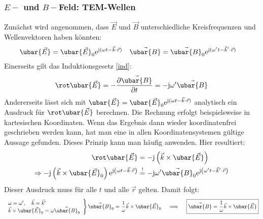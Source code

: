   \subsubsection{$E-$ und $B-$Feld: TEM-Wellen}\label{tem}
	Zunächst wird angenommen, dass \(\vec{E}\) und \(\vec{B} \) unterschiedliche Kreisfrequenzen und Wellenvektoren haben könnten:
		        \begin{align}\label{ebharm}
			        \ubar{\vec{E}} & = \ubar{\vec{E}}_0  \mathrm{e}^{\mathrm{j}(\omega t - \vec{k}\cdot\vec{r} )} & \vec{\ubar{B}} & = \vec{\ubar{B}}_0  \mathrm{e}^{\mathrm{j}(\omega ' t - \vec{k} \ensuremath{'}\cdot\vec{r} )}
		        \end{align}
		  Einerseits gilt das Induktionsgesetz \ref{ind}:
		        \begin{equation}\begin{split}
				        \rot \ubar{\vec{E}} = -\frac{\partial \vec{\ubar{B}}}{\partial t}= -\mathrm{j}\omega ' \vec{\ubar{B}}
		\end{split}\end{equation}  
	Andererseits lässt sich mit $\ubar{\vec{E}} = \ubar{\vec{E}}_0  \mathrm{e}^{\mathrm{j}(\omega t - \vec{k}\cdot\vec{r} )}$ analytisch ein Ausdruck für $ \rot \ubar{\vec{E}} $ berechnen. Die Rechnung erfolgt beispielsweise in kartesischen Koordinaten. Wenn das Ergebnis dann wieder koordinatenfrei geschrieben werden kann, hat man eine in allen Koordinatensystemen gültige Aussage gefunden. Dieses Prinzip kann man häufig anwenden. Hier resultiert:
\begin{equation}\begin{split} 
				        \rot \ubar{\vec{E}}& = -\mathrm{j}\left( \vec{k} \times \ubar{\vec{E}}\right)\\
				        \Rightarrow  -\mathrm{j}\left( \vec{k} \times \ubar{\vec{E}}_0 \right)  \mathrm{e}^{\mathrm{j}\left(\omega t - \vec{k}\cdot\vec{r} \right)}  &\stackrel{!}{=} -\mathrm{j}\omega' \vec{\ubar{B}}_0  \mathrm{e}^{\mathrm{j}\left(\omega' t -\vec{k}'\cdot\vec{r} \right)}
			        \end{split}\end{equation}
		 Dieser Ausdruck muss für alle \(t\) und alle \(\vec{r} \) gelten. Damit folgt:
		        \begin{equation}\begin{split}
				         \left. \begin{array}{l}
					        \omega = \omega', \quad    \vec{k} = \vec{k}' \\
					        \vec{k}\times\ubar{\vec{E}}_0 = \omega\vec{\ubar{B}}_0
				        \end{array}
				        \right\rbrace \vec{\ubar{B}}_0 = \frac{1}{\omega} \vec{k} \times\ubar{\vec{E}}_0 \quad\implies \quad \boxed{\vec{\ubar{B}} = \frac{1}{\omega} \vec{k} \times\ubar{\vec{E}}}\\
			        \end{split}\end{equation}
